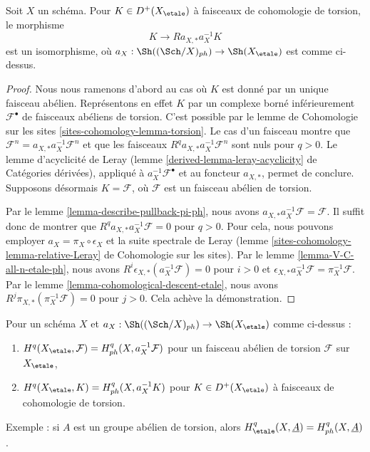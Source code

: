 \begin{lemma}
\label{lemma-cohomological-descent-etale-ph}
Soit $X$ un schéma. Pour $K \in D^+(X_\etale)$ à faisceaux de cohomologie
de torsion, le morphisme
$$
K \longrightarrow Ra_{X, *}a_X^{-1}K
$$
est un isomorphisme, où $a_X : \Sh((\Sch/X)_{ph}) \to \Sh(X_\etale)$ est comme ci-dessus.
\end{lemma}

\begin{proof}
Nous nous ramenons d'abord au cas où
$K$ est donné par un unique faisceau abélien. Représentons en effet $K$
par un complexe borné inférieurement $\mathcal{F}^\bullet$ de faisceaux
abéliens de torsion. C'est possible par le lemme de Cohomologie sur les sites
\ref{sites-cohomology-lemma-torsion}. Le cas d'un
faisceau montre que
$\mathcal{F}^n = a_{X, *} a_X^{-1} \mathcal{F}^n$
et que les faisceaux $R^qa_{X, *}a_X^{-1}\mathcal{F}^n$
sont nuls pour $q > 0$. Le lemme d'acyclicité de Leray
(lemme \ref{derived-lemma-leray-acyclicity} de Catégories dérivées),
appliqué à $a_X^{-1}\mathcal{F}^\bullet$
et au foncteur $a_{X, *}$, permet de conclure. Supposons désormais $K = \mathcal{F}$,
où $\mathcal{F}$ est un faisceau abélien de torsion.

\medskip\noindent
Par le lemme \ref{lemma-describe-pullback-pi-ph}, nous avons
$a_{X, *}a_X^{-1}\mathcal{F} = \mathcal{F}$. Il suffit donc de montrer que
$R^qa_{X, *}a_X^{-1}\mathcal{F} = 0$ pour $q > 0$.
Pour cela, nous pouvons employer $a_X = \pi_X \circ \epsilon_X$ et
la suite spectrale de Leray
(lemme \ref{sites-cohomology-lemma-relative-Leray} de Cohomologie sur les sites).
Par le lemme \ref{lemma-V-C-all-n-etale-ph},
nous avons $R^i\epsilon_{X, *}(a_X^{-1}\mathcal{F}) = 0$ pour $i > 0$
et $\epsilon_{X, *}a_X^{-1}\mathcal{F} = \pi_X^{-1}\mathcal{F}$.
Par le lemme \ref{lemma-cohomological-descent-etale}, nous avons
$R^j\pi_{X, *}(\pi_X^{-1}\mathcal{F}) = 0$ pour $j > 0$.
Cela achève la démonstration.
\end{proof}

\begin{lemma}
\label{lemma-compare-cohomology-etale-ph}
Pour un schéma $X$ et $a_X : \Sh((\Sch/X)_{ph}) \to \Sh(X_\etale)$
comme ci-dessus :
\begin{enumerate}
\item $H^q(X_\etale, \mathcal{F}) = H^q_{ph}(X, a_X^{-1}\mathcal{F})$
pour un faisceau abélien de torsion $\mathcal{F}$ sur $X_\etale$,
\item $H^q(X_\etale, K) = H^q_{ph}(X, a_X^{-1}K)$
pour $K \in D^+(X_\etale)$ à faisceaux de cohomologie de torsion.
\end{enumerate}
Exemple : si $A$ est un groupe abélien de torsion, alors
$H^q_\etale(X, \underline{A}) = H^q_{ph}(X, \underline{A})$.
\end{lemma}

